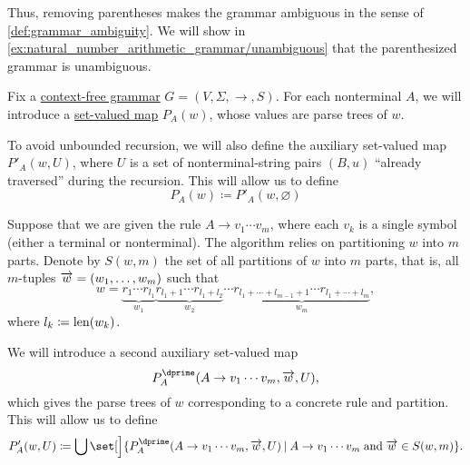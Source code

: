 \begin{example}
\begin{thmenum}
    Thus, removing parentheses makes the grammar ambiguous in the sense of \cref{def:grammar_ambiguity}. We will show in \cref{ex:natural_number_arithmetic_grammar/unambiguous} that the parenthesized grammar is unambiguous.
  \end{thmenum}
\end{example}

\begin{algorithm}\label{alg:brute_force_parsing}
  Fix a \hyperref[def:chomsky_hierarchy/context_free]{context-free grammar} \( G = (V, \Sigma, \to, S) \). For each nonterminal \( A \), we will introduce a \hyperref[def:function]{set-valued map} \( P_A(w) \), whose values are parse trees of \( w \).

  To avoid unbounded recursion, we will also define the auxiliary set-valued map \( P'_A(w, U) \), where \( U \) is a set of nonterminal-string pairs \( (B, u) \) \enquote{already traversed} during the recursion. This will allow us to define
  \begin{equation*}
    P_A(w)
    \coloneqq
    P'_A(w, \varnothing)
  \end{equation*}

  Suppose that we are given the rule \( A \to v_1 \cdots v_m \), where each \( v_k \) is a single symbol (either a terminal or nonterminal). The algorithm relies on partitioning \( w \) into \( m \) parts. Denote by \( S(w, m) \) the set of all partitions of \( w \) into \( m \) parts, that is, all \( m \)-tuples \( \overrightarrow{w} = (w_1, \ldots, w_m) \) such that
  \begin{equation*}
    w = \underbrace{ r_1 \cdots r_{l_1} }_{w_1} \underbrace{ r_{l_1 + 1} \cdots r_{l_1 + l_2} }_{w_2} \cdots \underbrace{ r_{l_1 + \cdots + l_{m-1} + 1} \cdots r_{l_1 + \cdots + l_m} }_{w_m},
  \end{equation*}
  where \( l_k \coloneqq \operatorname{len}(w_k) \).

  We will introduce a second auxiliary set-valued map
  \begin{equation*}
    P^\dprime_A(A \to v_1 \cdots v_m, \vect w, U),
  \end{equation*}
  which gives the parse trees of \( w \) corresponding to a concrete rule and partition. This will allow us to define
  \begin{equation*}
    P'_A(w, U)
    \coloneqq
    \bigcup\set[\Big]{ P^\dprime_A(A \to v_1 \cdots v_m, \vect w, U) \given A \to v_1 \cdots v_m \T{and} \vect w \in S(w, m) }.
  \end{equation*}


\end{algorithm}
